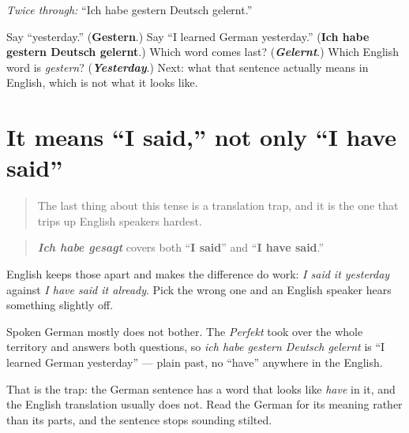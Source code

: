 \emph{Twice through:} \textquotedblleft{}Ich habe gestern Deutsch gelernt.\textquotedblright{}

\begin{tcolorbox}[breakable,colback=teal!4,colframe=teal!35!black,title={Before you move on}]
Say \textquotedblleft{}yesterday.\textquotedblright{} (\textbf{Gestern}.) Say \textquotedblleft{}I learned German yesterday.\textquotedblright{} (\textbf{Ich habe gestern Deutsch gelernt}.) Which word comes last? (\emph{\textbf{Gelernt}}.) Which English word is \emph{gestern}? (\emph{\textbf{Yesterday}}.) Next: what that sentence actually means in English, which is not what it looks like.
\end{tcolorbox}
\section[ich habe gesagt = I said]{It means \textquotedblleft{}I said,\textquotedblright{} not only \textquotedblleft{}I have said\textquotedblright{}}

\label{lesson:GE-C15-perfekt-als-vergangenheit}



\begin{quote}
The last thing about this tense is a translation trap, and it is the one that trips up English speakers hardest.
\end{quote}

\begin{grammarlens}[title={Grammar Lens: one German past for two English ones}]
\begin{quote}
\emph{\textbf{Ich habe gesagt}} covers both \textquotedblleft{}\textbf{I said}\textquotedblright{} and \textquotedblleft{}\textbf{I have said}.\textquotedblright{}
\end{quote}

English keeps those apart and makes the difference do work: \emph{I said it yesterday} against \emph{I have said it already}. Pick the wrong one and an English speaker hears something slightly off.

Spoken German mostly does not bother. The \emph{Perfekt} took over the whole territory and answers both questions, so \emph{ich habe gestern Deutsch gelernt} is \textquotedblleft{}I learned German yesterday\textquotedblright{} — plain past, no \textquotedblleft{}have\textquotedblright{} anywhere in the English.

That is the trap: the German sentence has a word that looks like \emph{have} in it, and the English translation usually does not. Read the German for its meaning rather than its parts, and the sentence stops sounding stilted.
\end{grammarlens}

